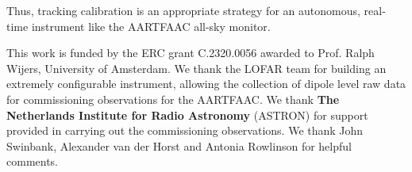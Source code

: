 \documentclass{aa}
\begin{document}
Thus,  tracking calibration  is an appropriate  strategy for  an autonomous,
real-time instrument like the \mbox{AARTFAAC} all-sky monitor.

\begin {acknowledgements}
This work is funded by the ERC grant C.2320.0056 awarded to Prof.  Ralph Wijers,
University  of Amsterdam.  We  thank the  LOFAR team  for building  an extremely
configurable instrument,  allowing the collection  of dipole level raw  data for
commissioning  observations  for  the  \mbox{AARTFAAC}.   We  thank  \textbf{The
  Netherlands Institute  for Radio Astronomy}  (ASTRON) for support  provided in
carrying out  the commissioning observations. We thank  John Swinbank, Alexander
van der Horst and Antonia Rowlinson for helpful comments.
\end{acknowledgements}


\end{document}
